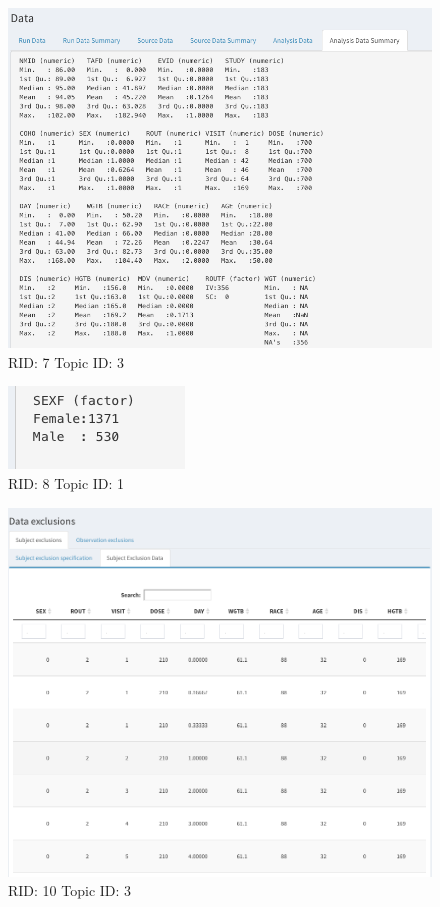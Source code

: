 \documentclass{article}
\begin{document}
\begin{figure}[hp]
\includegraphics[width=.8\textwidth]{screencaps/7-3-1.png}
\caption{RID: 7 Topic ID: 3}
\end{figure}
\newpage
\begin{figure}[hp]
\includegraphics[width=.8\textwidth]{screencaps/8-1-1.png}
\caption{RID: 8 Topic ID: 1}
\end{figure}
\newpage
\begin{figure}[hp]
\includegraphics[width=.8\textwidth]{screencaps/10-3-1.png}
\caption{RID: 10 Topic ID: 3}
\end{figure}
\end{document}
